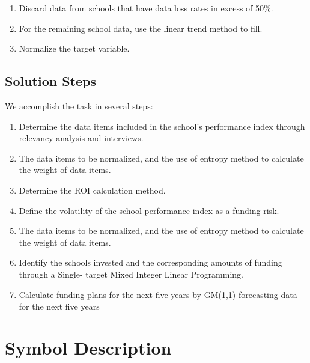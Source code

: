 \documentclass{mcmthesis}
\begin{document}
\begin{enumerate}[step: 1]
	\item  Discard data from schools that have data loss rates in excess of 50\%.
	\item For the remaining school data, use the linear trend method to fill.
	\item  Normalize the target variable.
\end{enumerate}

\subsection{Solution Steps}

\par We accomplish the task in several steps:
\begin{enumerate}[step 1:]
\item Determine the data items included in the school's performance index through relevancy analysis and interviews.
\item The data items to be normalized, and the use of entropy method to calculate the weight of data items.
\item Determine the ROI calculation method.
\item Define the volatility of the school performance index as a funding risk.
\item The data items to be normalized, and the use of entropy method to calculate the weight of data items.
\item Identify the schools invested and the corresponding amounts of funding through a Single- target Mixed Integer Linear Programming.
\item Calculate funding plans for the next five years by GM(1,1) forecasting data for the next five years
\end{enumerate}


\section{Symbol Description}
\end{document}

